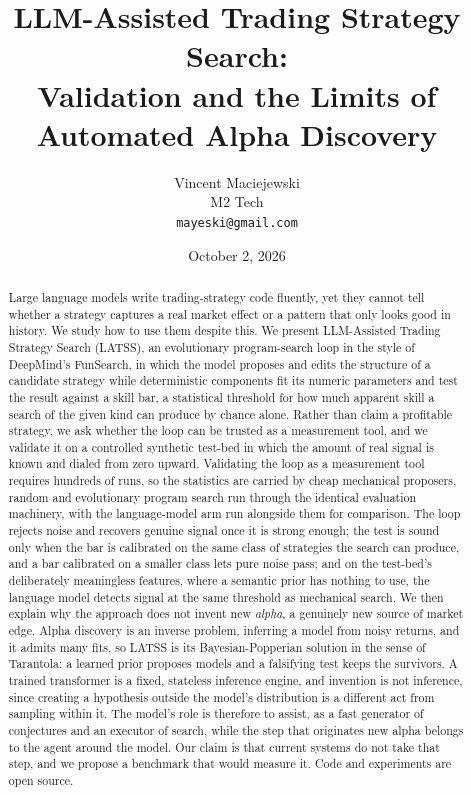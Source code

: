 \documentclass[11pt]{article}
\title{\textbf{LLM-Assisted Trading Strategy Search:\\
Validation and the Limits of Automated Alpha Discovery}}
\author{Vincent Maciejewski\\
\small M2 Tech\\
\small \texttt{mayeski@gmail.com}}
\date{October 2, 2026}
\begin{document}
\maketitle

\begin{abstract}
Large language models write trading-strategy code fluently, yet they cannot tell whether a strategy
captures a real market effect or a pattern that only looks good in history. We study how to use them
despite this. We present LLM-Assisted Trading Strategy Search (LATSS), an evolutionary program-search
loop in the style of DeepMind's FunSearch, in which the model proposes and edits the structure of a
candidate strategy while deterministic components fit its numeric parameters and test the result against
a skill bar, a statistical threshold for how much apparent skill a search of the given kind can produce
by chance alone. Rather than claim a profitable strategy, we ask whether the loop
can be trusted as a measurement tool, and we validate it on a controlled synthetic test-bed in
which the amount of real signal is known and dialed from zero upward. Validating the loop as a measurement
tool requires hundreds of runs, so the statistics are carried by cheap mechanical proposers, random and
evolutionary program search run through the identical evaluation machinery, with the language-model arm
run alongside them for comparison. The loop rejects noise and recovers genuine signal once it is strong enough;
the test is sound only when the bar is calibrated on the same class of strategies the search can produce,
and a bar calibrated on a smaller class lets pure noise pass; and on the test-bed's deliberately
meaningless features, where a semantic prior has nothing to use, the language model detects signal at
the same threshold as mechanical search. We then explain why the
approach does not invent new \emph{alpha}, a genuinely new source of market edge. Alpha discovery is an
inverse problem, inferring a model from noisy returns, and it admits many fits, so LATSS is its
Bayesian-Popperian solution in the sense of Tarantola: a learned prior proposes models and a falsifying
test keeps the survivors. A trained transformer is a fixed,
stateless inference engine, and invention is not inference, since creating a hypothesis outside the
model's distribution is a different act from sampling within it. The model's role is therefore to assist,
as a fast generator of conjectures and an executor of search, while the step that originates new alpha
belongs to the agent around the model. Our claim is that current systems do not take that step, and we
propose a benchmark that would measure it. Code and experiments are open source.
\end{abstract}
\end{document}

